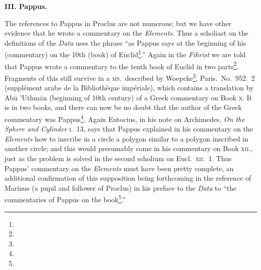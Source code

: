 \textbf{III. Pappus.}

The references to Pappus in Proclus are not numerous; but we have other evidence that he wrote a commentary on the \emph{Elements}. Thus a scholiast on the definitions of the \emph{Data} uses the phrase ``as Pappus says at the beginning of his (commentary) on the 10th (book) of Euclid\footnote{}.'' Again in the \emph{Fihrist} we are told that Pappus wrote a commentary to the tenth book of Euclid in two parts\footnote{}. Fragments of this still survive in a \textsc{ms}.\ described by Woepcke\footnote{}, Paris.\ No.~952.~2 (supplément arabe de la Bibliothèque impériale), which contains a translation by Abū 'Uthmān (beginning of 10th century) of a Greek commentary on Book \textsc{x}. It is in two books, and there can now be no doubt that the author of the Greek commentary was Pappus\footnote{}. Again Eutocius, in his note on Archimedes, \emph{On the Sphere and Cylinder} \textsc{i}.~13, says that Pappus explained in his commentary on the \emph{Elements} how to inscribe in a circle a polygon similar to a polygon inscribed in another circle; and this would presumably come in his commentary on Book \textsc{xii}., just as the problem is solved in the second scholium on Eucl.\ \textsc{xii}.~1. Thus Pappus' commentary on the \emph{Elements} must have been pretty complete, an additional confirmation of this supposition being forthcoming in the reference of Marinus (a pupil and follower of Proclus) in his preface to the \emph{Data} to ``the commentaries of Pappus on the book\footnote{}.''